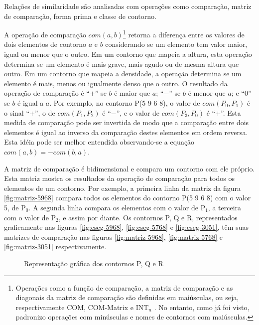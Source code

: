 Relações de similaridade \cite{marvin.ea87:relating} são analisadas
com operações como comparação, matriz de comparação, forma prima e
classe de contorno.

A operação de comparação $com(a,b)$\footnote{Operações como a função
  de comparação, a matriz de comparação e as diagonais da matriz de
  comparação são definidas em maiúsculas, ou seja, respectivamente
  COM, COM-Matrix e INT$_n$ \cite{morris87:composition}. No entanto,
  como já foi visto, padronizo operações com minúsculas e nomes de
  contornos com maiúsculas.} retorna a diferença entre os valores de
dois elementos de contorno $a$ e $b$ considerando se um elemento tem
valor maior, igual ou menor que o outro. Em um contorno que mapeia a
altura, esta operação determina se um elemento é mais grave, mais
agudo ou de mesma altura que outro. Em um contorno que mapeia a
densidade, a operação determina se um elemento é mais, menos ou
igualmente denso que o outro. O resultado da operação de comparação é
``$+$'' se $b$ é maior que $a$; ``$-$'' se $b$ é menor que $a$; e
``$0$'' se $b$ é igual a $a$. Por exemplo, no contorno P(5 9 6 8), o
valor de $com(P_0,P_1)$ é o sinal ``$+$'', o de $com(P_1,P_2)$ é
``$-$'', e o valor de $com(P_3,P_0)$ é ``$+$''. Esta medida de
comparação pode ser invertida de modo que a comparação entre dois
elementos é igual ao inverso da comparação destes elementos em ordem
reversa. Esta idéia pode ser melhor entendida observando-se a equação
$com(a,b)=-com(b,a)$.

A matriz de comparação é bidimensional e compara um contorno com ele
próprio. Esta matriz mostra os resultados da operação de comparação
para todos os elementos de um contorno. Por exemplo, a primeira linha
da matriz da figura \ref{fig:matriz-5968} compara todos os elementos
do contorno P(5 9 6 8) com o valor 5, de P$_0$. A segunda linha
compara os elementos com o valor de P$_1$, a terceira com o valor de
P$_2$, e assim por diante. Os contornos P, Q e R, representados
graficamente nas figuras \ref{fig:cseg-5968}, \ref{fig:cseg-5768} e
\ref{fig:cseg-3051}, têm suas matrizes de comparação nas figuras
\ref{fig:matriz-5968}, \ref{fig:matriz-5768} e \ref{fig:matriz-3051}
respectivamente.

\begin{figure}
  \centering
  \subfloat[contorno P(5 9 6 8)]{
    \texttt{[image: c-5968]}
    \label{fig:cseg-5968}
  }
  \subfloat[contorno Q(5 7 6 8)]{
    \texttt{[image: c-5768]}
    \label{fig:cseg-5768}
  }
  \subfloat[contorno R(3 0 5 1)]{
    \texttt{[image: c-3051]}
    \label{fig:cseg-3051}
  }
  \caption{Representação gráfica dos contornos P, Q e R}
  \label{fig:repr-grafica-pqr}
\end{figure}

